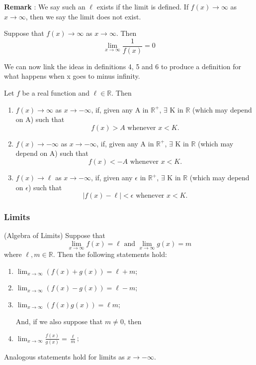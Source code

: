\documentclass[12pt]{article}
\begin{document}
			{\bf{Remark}} : We say such an $\ell$ exists if the limit is defined. If $f(x) \to \infty$ as $x \to \infty$, 							then we say the limit does not exist.

			\begin{thm}
				Suppose that $f(x) \to \infty$ as $x \to \infty$. Then
						\[
							\lim_{x \to \infty}{\frac{1}{f(x)}} = 0
						\]
			\end{thm}

			We can now link the ideas in definitions 4, 5 and 6 to produce a definition for what happens when x goes to 				minus infinity.

			\begin{defn}
				Let $f$ be a real function and $\ell \in \mathbb{R}$. Then
				\begin{enumerate}
					\item $f(x) \to \infty$ as $x \to -\infty$, if, given any A in $\mathbb{R}^+$, $\exists$ K in 							$\mathbb{R}$ (which may depend on A) such that
								\[
									f(x) > A \mbox{    whenever    } x < K.
								\]
					\item $f(x) \to -\infty$ as $x \to -\infty$, if, given any A in $\mathbb{R}^+$, $\exists$ K in 							$\mathbb{R}$ (which may depend on A) such that
								\[
									f(x) < -A \mbox{    whenever    } x < K.
								\]			
					\item $f(x) \to \ell$ as $x \to -\infty$, if, given any $\epsilon$ in $\mathbb{R}^+$, $\exists$ 						K in $\mathbb{R}$ (which may depend on $\epsilon$) such that
						\[
							|f(x) - \ell| < \epsilon \mbox{    whenever    } x < K.
						\]
				\end{enumerate}
			\end{defn}

		\subsubsection{Limits}
			\begin{thm}
				(Algebra of Limits) Suppose that
					\[
						\lim_{x \to \infty}{f(x)} = \ell     \mbox{     and     }     \lim_{x \to \infty}{g(x)} = m
					\]
				where $\ell, m \in \mathbb{R}$. Then the following statements hold:
					\begin{enumerate}
						\item $\lim_{x \to \infty}{(f(x) + g(x))} = \ell + m$;
						\item $\lim_{x \to \infty}{(f(x) - g(x))} = \ell - m$;
						\item $\lim_{x \to \infty}{(f(x)g(x))} = \ell m$;

				And, if we also suppose that $m \neq 0$, then

						\item $\lim_{x \to \infty}{\frac{f(x)}{g(x)}} = \frac{\ell}{m}$;
					\end{enumerate}

				Analogous statements hold for limits as $x \to -\infty$.
			\end{thm}
\end{document}
